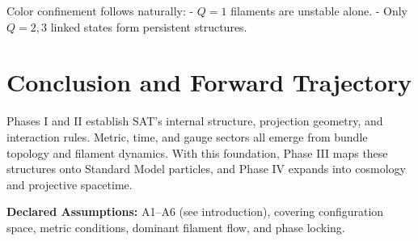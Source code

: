 Color confinement follows naturally:
- $Q=1$ filaments are unstable alone.
- Only $Q=2,3$ linked states form persistent structures.

\section{Conclusion and Forward Trajectory}

Phases I and II establish SAT’s internal structure, projection geometry, and interaction rules. Metric, time, and gauge sectors all emerge from bundle topology and filament dynamics. With this foundation, Phase III maps these structures onto Standard Model particles, and Phase IV expands into cosmology and projective spacetime.

\bigskip
\noindent\textbf{Declared Assumptions:}
A1--A6 (see introduction), covering configuration space, metric conditions, dominant filament flow, and phase locking.
